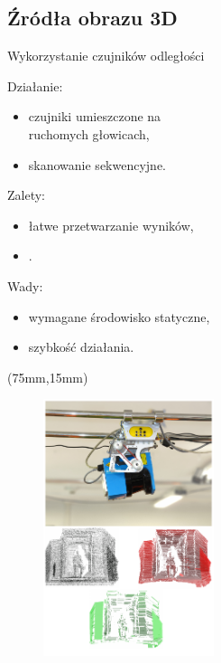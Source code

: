 \documentclass[xcolor=x11names,compress]{beamer}
\renewcommand{\(}{\begin{columns}}
\renewcommand{\)}{\end{columns}}
\newcommand{\<}[1]{\begin{column}{#1}}
\renewcommand{\>}{\end{column}}
\begin{document}
\subsection{Źródła obrazu 3D}
\begin{frame}{Wykorzystanie czujników odległości}

\alert{Działanie:}
\begin{itemize}
\item czujniki umieszczone na\\ruchomych głowicach,
\item skanowanie sekwencyjne.
\end{itemize}

\vspace{.5cm}

\alert{Zalety:}
\begin{itemize}
\item łatwe przetwarzanie wyników,
\item .
\end{itemize}

\vspace{.5cm}

\alert{Wady:}
\begin{itemize}
\item wymagane środowisko statyczne,
\item szybkość działania.
\end{itemize}

\begin{textblock*}{50mm}(75mm,15mm)%
    \begin{minipage}[l]{50mm}%

	\begin{figure}[h!]
    \centering
    \includegraphics[width=5.0cm]{../Common/img/sick_vert}
    \end{figure}

    \end{minipage}
\end{textblock*}

\end{frame}
\end{document}
